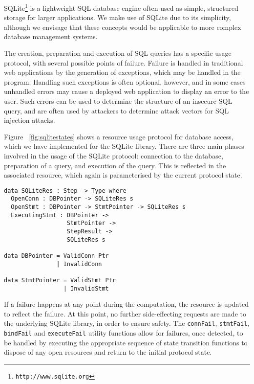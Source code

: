 \documentclass[preprint]{sigplanconf}
\begin{document}
SQLite\footnote{\texttt{http://www.sqlite.org}} is a lightweight SQL database engine often used as simple, structured storage for larger applications. We make use of SQLite due to its simplicity, although we envisage that these concepts would be applicable to more complex database management systems. 

The creation, preparation and execution of SQL queries has a specific usage protocol, with several possible points of failure. Failure is handled in traditional web applications by the generation of exceptions, which may be handled in the program.
Handling such exceptions is often optional, however, and in some cases unhandled errors may cause a deployed web application to display an error to the user. Such errors can be used to determine the structure of an insecure SQL query, and are often used by attackers to determine attack vectors for SQL injection attacks.

Figure ~\ref{fig:sqlitestates} shows a resource usage protocol for database access, which we have implemented for the SQLite library. There are three main phases involved in the usage of the SQLite protocol: connection to the database, preparation of a query, and execution of the query. This is reflected in the associated resource, which again is parameterised by the current protocol state.
{\small
\begin{verbatim}
data SQLiteRes : Step -> Type where
  OpenConn : DBPointer -> SQLiteRes s
  OpenStmt : DBPointer -> StmtPointer -> SQLiteRes s
  ExecutingStmt : DBPointer -> 
                  StmtPointer -> 
                  StepResult -> 
                  SQLiteRes s
                  
data DBPointer = ValidConn Ptr
               | InvalidConn

data StmtPointer = ValidStmt Ptr
                 | InvalidStmt 
\end{verbatim}
}
If a failure happens at any point during the computation, the resource is updated to reflect the failure. At this point, no further side-effecting requests are made to the underlying SQLite library, in order to ensure safety. The \texttt{connFail}, \texttt{stmtFail}, \texttt{bindFail} and \texttt{executeFail} utility functions allow for failures, once detected, to be handled by executing the appropriate sequence of state transition functions to dispose of any open resources and return to the initial protocol state. 
\end{document}
